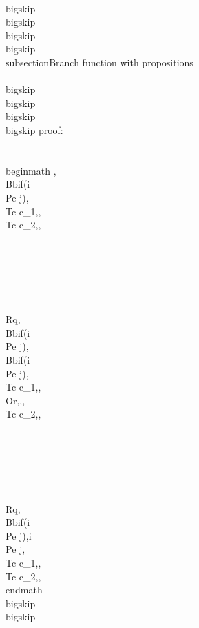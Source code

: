 \\bigskip
\\bigskip
\\bigskip
\\bigskip
\\subsection{Branch function with propositions}
\\[, \\Bb{if(i \\Pe j)}{,\\Tc c_1,}{,\\Tc c_2,}, \\Rq , \\Bb{if(i \\Pe j)}{,i \\Pe j,\\Tc c_1,}{,\\Tc c_2,},\\]


\\bigskip
\\bigskip
\\bigskip
\\bigskip
proof:\\\\
\\begin{math} 
, \\Bb{if(i \\Pe j)}{,\\Tc c_1,}{,\\Tc c_2,},\\\\\\\\\\\\
\\Rq, \\Bb{if(i \\Pe j)}{, \\Bb{if(i \\Pe j)}{,\\Tc c_1,}{,\\Or,},}{,\\Tc c_2,},\\\\\\\\\\\\
\\Rq, \\Bb{if(i \\Pe j)}{,i \\Pe j,\\Tc c_1,}{,\\Tc c_2,},
\\end{math}
\\bigskip
\\bigskip



